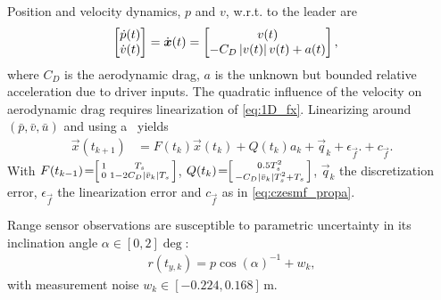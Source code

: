 \documentclass{ifacconf}
\begin{document}
Position and velocity dynamics, $p$ and $v$, w.r.t. to the leader
are 
\begin{align}
\label{eq:1D_fx}
\left[\begin{matrix}
    \dot{p}(t)\\\dot{v}(t)
\end{matrix}\right]=\dot{\boldsymbol{x}}(t)
&=
\left[\begin{matrix}
v(t)\\
-C_D \left\lvert v(t)\right\rvert v(t)+ a(t)
\end{matrix}\right],
\end{align}
where $C_D$ is the aerodynamic drag, $a$ is the unknown but bounded relative acceleration due to driver inputs.
The quadratic influence of the velocity on aerodynamic drag requires linearization of \eqref{eq:1D_fx}.
Linearizing around $(\bar{p},\bar{v},\bar{u})$ and using a \zohshort\ yields
\begin{align}
\label{eq:1D_AxBu}
\vec{x}(t_{k+1})
&=
F(t_{k}) \vec{x}(t_{k})
+
Q(t_{k})
a_k
+ \vec{q}_k
+ \epsilon_{\vec{f}}.
+ c_{\vec{f}}.
\end{align}
With ${F(t_{k-1})\!=\!\!\left[\begin{smallmatrix}
1&T_s\\
0& 1 - 2C_D\left\lvert\bar{v}_k\right\rvert T_s
\end{smallmatrix}\right]}$, ${Q(t_{k})\!=\!\!\left[\begin{smallmatrix}
  0.5T_s^2 \\ -C_D\left\lvert\bar{v}_k\right\rvert T_s^2+T_s \end{smallmatrix}\right]}$,
$\vec{q}_k$ the discretization error,
$\epsilon_{\vec{f}}$ the linearization error and $c_{\vec{f}}$
as in \eqref{eq:czesmf_propa}.

Range sensor observations are susceptible to parametric uncertainty in its inclination angle ${\alpha \in [0, 2] \deg}$:
\begin{align}
r(t_{y,k}) =
p \cos(\alpha)^{-1}
+ w_k,
\label{eq:mn1_h}
\end{align}
with measurement noise ${w_k \in [-0.224, 0.168] \, \mathrm{m}}$.
\end{document}
